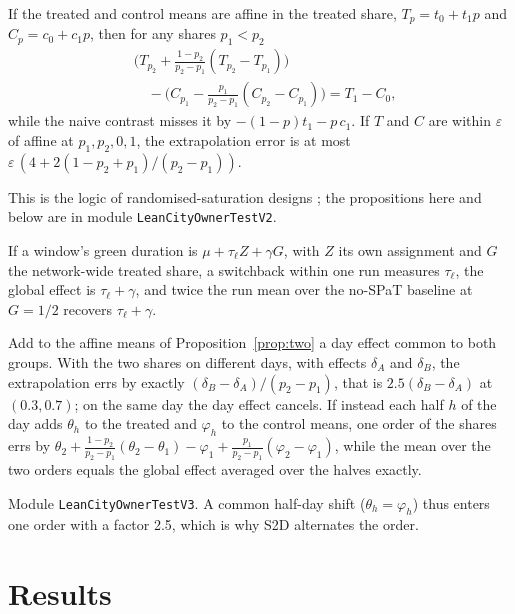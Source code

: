 \begin{proposition}\label{prop:two}
If the treated and control means are affine in the treated share, $T_p=t_0+t_1p$ and $C_p=c_0+c_1p$, then for any shares $p_1<p_2$
\[\begin{aligned}&\Big(T_{p_2}+\tfrac{1-p_2}{p_2-p_1}(T_{p_2}-T_{p_1})\Big)\\&\quad-\Big(C_{p_1}-\tfrac{p_1}{p_2-p_1}(C_{p_2}-C_{p_1})\Big)=T_1-C_0,\end{aligned}\]
while the naive contrast misses it by $-(1-p)t_1-p\,c_1$. If $T$ and $C$ are within $\varepsilon$ of affine at $p_1,p_2,0,1$, the
extrapolation error is at most $\varepsilon\,(4+2(1-p_2+p_1)/(p_2-p_1))$.
\end{proposition}
\noindent This is the logic of randomised-saturation designs \cite{baird2018,hudgens2008}; the propositions here and below are in module
\texttt{LeanCityOwnerTestV2}.

\begin{proposition}\label{prop:global}
If a window's green duration is $\mu+\tau_\ell Z+\gamma G$, with $Z$ its own assignment and $G$ the network-wide treated share, a
switchback within one run measures $\tau_\ell$, the global effect is $\tau_\ell+\gamma$, and twice the run mean over the no-SPaT baseline at
$G=1/2$ recovers $\tau_\ell+\gamma$.
\end{proposition}

\begin{proposition}\label{prop:sameday}
Add to the affine means of Proposition~\ref{prop:two} a day effect common to both groups. With the two shares on different days, with
effects $\delta_A$ and $\delta_B$, the extrapolation errs by exactly $(\delta_B-\delta_A)/(p_2-p_1)$, that is $2.5(\delta_B-\delta_A)$ at
$(0.3,0.7)$; on the same day the day effect cancels. If instead each half $h$ of the day adds $\theta_h$ to the treated and $\varphi_h$ to
the control means, one order of the shares errs by
$\theta_2+\tfrac{1-p_2}{p_2-p_1}(\theta_2-\theta_1)-\varphi_1+\tfrac{p_1}{p_2-p_1}(\varphi_2-\varphi_1)$, while the mean over the two orders
equals the global effect averaged over the halves exactly.
\end{proposition}
\noindent Module \texttt{LeanCityOwnerTestV3}. A common half-day shift ($\theta_h=\varphi_h$) thus enters one order with a factor 2.5,
which is why S2D alternates the order.

\section{Results}\label{sec:results}
